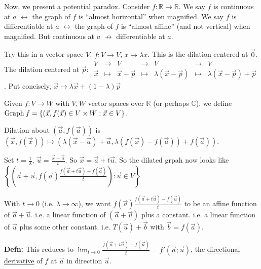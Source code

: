 \documentclass[10pt,letterpaper]{article}
\newcommand{\n}{\hfill\break}
\newcommand{\defn}[1]{\par\noindent\settowidth{\hangindent}{\textbf{Defn: }}\textbf{Defn: }#1\n}
\newcommand{\ptxt}[1]{\textrm{\textnormal{#1}}}
\newcommand{\set}[1]{\left\{#1\right\}}
\newcommand{\reals}{\mathbb{R}}
\newcommand{\R}{\reals}
\newcommand{\complex}{\mathbb{C}}
\newcommand{\C}{\complex}
\newcommand{\Graph}{\ptxt{Graph}\>}
\begin{document}
\par\noindent Now, we present a potential paradox. Consider $f:\R\to\R$.\n
We say $f$ is continuous at $a$ $\leftrightarrow$ the graph of $f$ is ``almost horizontal'' when magnified.\n
We say $f$ is differentiable at $a$ $\leftrightarrow$ the graph of $f$ is ``almost affine'' (and not vertical) when magnified.\n
But continuous at $a$ $\not\to$ differentiable at $a$.\n

\par\noindent Try this in a vector space $V$.\n
$f:V\to{}V$, $x\mapsto\lambda{}x$. This is the dilation centered at $\vec{0}$.\n
The dilation centered at $\vec{p}$:\n
$\displaystyle\begin{array}{ccccccc}V & \to & V & \to & V & \to & V\\
\vec{x} & \mapsto & \vec{x}-\vec{p} & \mapsto & \lambda(\vec{x}-\vec{p}) & \mapsto & \lambda(\vec{x}-\vec{p})+\vec{p}\end{array}$.\n
Put concisely, $\vec{x}\mapsto\lambda\vec{x}+(1-\lambda)\vec{p}$\n

\par\noindent Given $f:V\to{}W$ with $V,W$ vector spaces over $\R$ (or perhaps $\C$), we define $\Graph{}f=\set{(\vec{x},f(\vec{x})\in{}V\times{}W:\vec{x}\in{}V}$.\n

\par\noindent Dilation about $(\vec{a},f(\vec{a}))$ is $(\vec{x},f(\vec{x}))\mapsto(\lambda(\vec{x}-\vec{a})+\vec{a},\lambda(f(\vec{x})-f(\vec{a}))+f(\vec{a}))$.\n

\par\noindent Set $t=\frac{1}{\lambda}$, $\vec{u}=\frac{\vec{x}-\vec{a}}{t}$. So $\vec{x}=\vec{a}+t\vec{u}$. So the dilated grpah now looks like\n
$\displaystyle\set{\left(\vec{a}+\vec{u},f(\vec{a})\frac{f(\vec{a}+t\vec{u})-f(\vec{a})}{t}\right):\vec{u}\in{}V}$\n

\par\noindent With $t\to{}0$ (i.e. $\lambda\to\infty$), we want $f(\vec{a})\frac{f(\vec{a}+t\vec{u})-f(\vec{u})}{t}$ to be an affine function of $\vec{a}+\vec{u}$.\n
i.e. a linear function of $(\vec{a}+\vec{u})$ plus a constant.\n
i.e. a linear function of $\vec{u}$ plus some other constant.\n
i.e. $T(\vec{u})+\vec{b}$ with $\vec{b}=f(\vec{a})$.\n

\defn{This reduces to $\displaystyle\lim_{t\to{}0}\frac{f(\vec{a}+t\vec{u})-f(\vec{a})}{t}=f'(\vec{a};\vec{u})$, the \underline{directional derivative} of $f$ at $\vec{a}$ in direction $\vec{u}$.}
\end{document}
